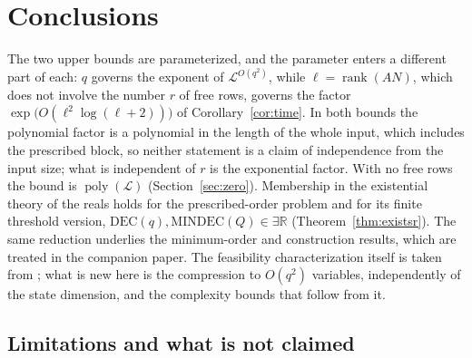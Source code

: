 \documentclass[journal]{IEEEtran}
\theoremstyle{plainn}
\theoremstyle{remark}
\begin{document}
\begin{table}[!t]
\centering
\caption{Where each statement of the paper is verified. \emph{Coverage}: \emph{Lean} = no hypothesis
beyond the paper's; \emph{Lean-cond.} = relative to the declared real-algebraic backend.
\emph{Formulation}: \emph{literal} = the paper's statement; \emph{general} = a stronger statement whose
instance is the paper's; \emph{abstract} = the same content for linear maps or submodules.
\emph{Bridge}: \emph{--} = nothing substantive is left paper-level; \emph{bridge} = the
matrix family proved is not yet bridged to the paper's; \emph{model} = only the arithmetic of a cost
model is proved. Reductions and counting are not numbered statements and stay paper-level
(Section~\ref{sec:limits}).}
\label{tab:evidence}
\footnotesize

\end{table}

\section{Conclusions}\label{sec:conclusions}

The two upper bounds are parameterized, and the parameter enters a different part of each: $q$
governs the exponent of $\mathcal L^{O(q^2)}$, while $\ell=\operatorname{rank}(AN)$, which does not
involve the number $r$ of free rows, governs the factor
$\exp\bigl(O(\ell^2\log(\ell+2))\bigr)$ of Corollary~\ref{cor:time}. In both bounds the polynomial
factor is a polynomial in the length of the whole input, which includes the prescribed block, so
neither statement is a claim of independence from the input size; what is independent of $r$ is the
exponential factor. With no free rows the bound is
$\operatorname{poly}(\mathcal L)$ (Section~\ref{sec:zero}). Membership in the existential theory of
the reals holds for the prescribed-order problem and for its finite threshold version,
$\mathrm{DEC}(q),\mathrm{MINDEC}(Q)\in\exists\mathbb R$ (Theorem~\ref{thm:existsr}). The same
reduction underlies the minimum-order and construction results, which are treated in the companion
paper.
The feasibility characterization itself is taken from \cite{fer10,dar25,fer26a,fer26b}; what is new here is the compression to $O(q^2)$ variables, independently of the state dimension, and the complexity bounds that follow from it.

\subsection{Limitations and what is not claimed}\label{sec:limits}
\end{document}
